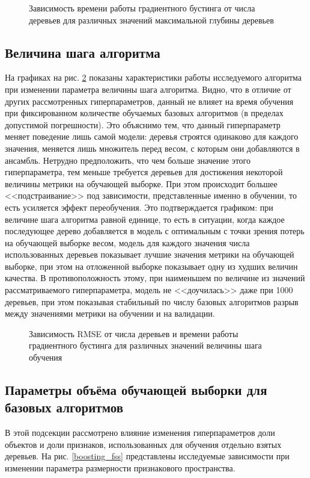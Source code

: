 \documentclass[a4paper, 14pt]{article}
\begin{document}
    \begin{figure}[h]
      \centering
      
      \caption{Зависимость времени работы градиентного бустинга от числа деревьев для различных значений максимальной глубины деревьев}\label{boosting_md_time}
    \end{figure}

\subsection{Величина шага алгоритма}

    На графиках на рис. \ref{boosting_lr} показаны характеристики работы исследуемого алгоритма при изменении параметра величины шага алгоритма. Видно, что в отличие от других рассмотренных гиперпараметров, данный не влияет на время обучения при фиксированном количестве обучаемых базовых алгоритмов (в пределах допустимой погрешности). Это объяснимо тем, что данный гиперпараметр меняет поведение лишь самой модели: деревья строятся одинаково для каждого значения, меняется лишь множитель перед весом, с которым они добавляются в ансамбль. Нетрудно предположить, что чем больше значение этого гиперпараметра, тем меньше требуется деревьев для достижения некоторой величины метрики на обучающей выборке. При этом происходит большее <<подстраивание>> под зависимости, представленные именно в обучении, то есть усиляется эффект переобучения. Это подтверждается графиком: при величине шага алгоритма равной единице, то есть в ситуации, когда каждое последующее дерево добавляется в модель с оптимальным с точки зрения потерь на обучающей выборке весом, модель для каждого значения числа использованных деревьев показывает лучшие значения метрики на обучающей выборке, при этом на отложенной выборке показывает одну из худших величин качества. В противоположность этому, при наименьшем по величине из значений рассматриваемого гиперпараметра, модель не <<доучилась>> даже при 1000 деревьев, при этом показывая стабильный по числу базовых алгоритмов разрыв между значениями метрики на обучении и на валидации.
    
    \begin{figure}[]
      \centering
      
      \caption{Зависимость RMSE от числа деревьев и времени работы градиентного бустинга для различных значений величины шага обучения}\label{boosting_lr}
    \end{figure}

\subsection{Параметры объёма обучающей выборки для базовых алгоритмов}
    В этой подсекции рассмотрено влияние изменения гиперпараметров доли объектов и доли признаков, использованных для обучения отдельно взятых деревьев. На рис. \ref{boosting_fss} представлены исследуемые зависимости при изменении параметра размерности признакового пространства.
\end{document}
